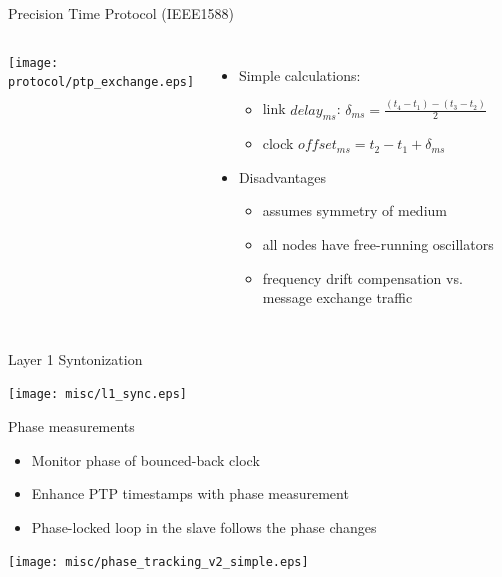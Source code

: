 \documentclass[compress,red]{beamer}
\begin{document}
\begin{frame}{Precision Time Protocol (IEEE1588)}

\begin{columns}[c]
  \column{1.2in}
  \begin{center}
    \texttt{[image: protocol/ptp\_exchange.eps]}
  \end{center}
  \column{3in}
    
  
  \begin{itemize}
    \item Simple calculations:
    \begin{itemize}
      \item link $delay_{ms}$: $\delta_{ms} = \frac{(t_{4}-t_{1}) - (t_{3}-t_{2})}{2}$
      \item clock $offset_{ms} = t_{2} - t_{1} + \delta_{ms}$
    \end{itemize}
   \item<2> Disadvantages
     \begin{itemize}
       \item assumes symmetry of medium
       \item all nodes have free-running oscillators
       \item frequency drift compensation vs. message exchange traffic
     \end{itemize}
   \end{itemize}
\end{columns}

\end{frame}

\begin{frame}{Layer 1 Syntonization}

  \begin{center}
    \texttt{[image: misc/l1\_sync.eps]}
  \end{center}
\end{frame}

\begin{frame}{Phase measurements}

  \begin{itemize}
    \item Monitor phase of bounced-back clock
    \item Enhance PTP timestamps with phase measurement
    \item Phase-locked loop in the slave follows the phase changes  
  \end{itemize}

  \begin{center}
    \texttt{[image: misc/phase\_tracking\_v2\_simple.eps]}
  \end{center}

\end{frame}
\end{document}
